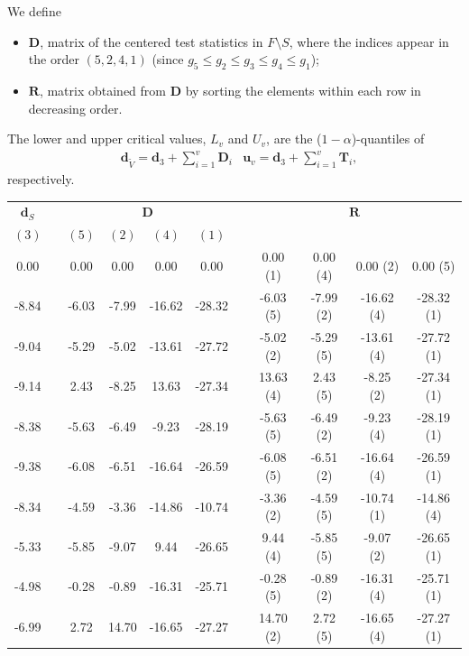 \documentclass[11pt,a4paper,openright,twoside]{article}
\begin{document}
We define
\begin{itemize}
\item $\mathbf{D}$, matrix of the centered test statistics in $F\setminus S$, where the indices appear in the order $(5,2,4,1)$ (since $g_5\leq g_2\leq g_3\leq g_4\leq g_1$);
\item $\mathbf{R}$, matrix obtained from $\mathbf{D}$ by sorting the elements within each row in decreasing order.
\end{itemize}
The lower and upper critical values, $L_v$ and $U_v$, are the ($1-\alpha$)-quantiles of
\begin{align*}
& \mathbf{d}_{\tilde{V}}=\mathbf{d}_3 + \sum_{i=1}^v \mathbf{D}_i & \mathbf{u}_v=\mathbf{d}_3 + \sum_{i=1}^v \mathbf{T}_i,
\end{align*}
respectively.

\newpage
\begin{table}[h!]
\centering
\begin{tabular}{ccccccccccc}
$\mathbf{d}_S$ & & \multicolumn{4}{c}{$\mathbf{D}$} & & \multicolumn{4}{c}{$\mathbf{R}$}\\
$(3)$ &  & $(5)$ & $(2)$ & $(4)$ & $(1)$ &  &  &  &  &  \\
\cline{1-1} \cline{3-6} \cline{8-11}
0.00 &  & 0.00 & 0.00 & 0.00 & 0.00 &  & 0.00 (1)& 0.00 (4)& 0.00 (2)& 0.00 (5)\\
-8.84 &  & -6.03 & -7.99 & -16.62 & -28.32 &  & -6.03 (5)& -7.99 (2)& -16.62 (4)& -28.32 (1)\\
-9.04 &  & -5.29 & -5.02 & -13.61 & -27.72 &  & -5.02 (2)& -5.29 (5)& -13.61 (4)& -27.72 (1)\\
-9.14 &  & 2.43 & -8.25 & 13.63 & -27.34 &  & 13.63 (4)& 2.43 (5)& -8.25 (2)& -27.34 (1)\\
-8.38 &  & -5.63 & -6.49 & -9.23 & -28.19 &  & -5.63 (5)& -6.49 (2)& -9.23 (4)& -28.19 (1)\\
-9.38 &  & -6.08 & -6.51 & -16.64 & -26.59 &  & -6.08 (5)& -6.51 (2)& -16.64 (4)& -26.59 (1)\\
-8.34 &  & -4.59 & -3.36 & -14.86 & -10.74 &  & -3.36 (2)& -4.59 (5)& -10.74 (1)& -14.86 (4)\\
-5.33 &  & -5.85 & -9.07 & 9.44 & -26.65 &  & 9.44 (4)& -5.85 (5)& -9.07 (2)& -26.65 (1)\\
-4.98 &  & -0.28 & -0.89 & -16.31 & -25.71 &  & -0.28 (5)& -0.89 (2)& -16.31 (4)& -25.71 (1)\\
-6.99 &  & 2.72 & 14.70 & -16.65 & -27.27 &  & 14.70 (2)& 2.72 (5)& -16.65 (4) & -27.27 (1)
\end{tabular}
\end{table}
\end{document}
